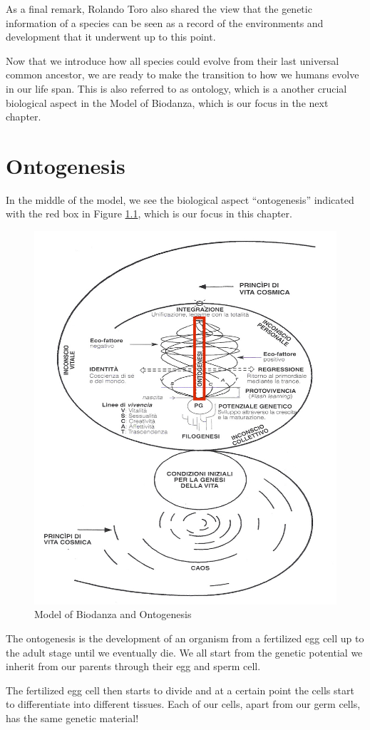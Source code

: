\documentclass[
  11pt,
]{book}
\begin{document}
As a final remark, Rolando Toro also shared the view that the genetic information of a species can be seen as a record of the environments and development that it underwent up to this point.

Now that we introduce how all species could evolve from their last universal common ancestor, we are ready to make the transition to how we humans evolve in our life span. This is also referred to as ontology, which is a another crucial biological aspect in the Model of Biodanza, which is our focus in the next chapter.

\hypertarget{ontogenesis}{%
\chapter{Ontogenesis}\label{ontogenesis}}

In the middle of the model, we see the biological aspect ``ontogenesis'' indicated with the red box in Figure \ref{fig:modelOnto}, which is our focus in this chapter.

\begin{figure}

{\centering \includegraphics[width=0.5\linewidth]{./figs/biologischeAspectenBiodanzaDeelIII} 

}

\caption{Model of Biodanza and Ontogenesis}\label{fig:modelOnto}
\end{figure}

The ontogenesis is the development of an organism from a fertilized egg cell up to the adult stage until we eventually die.
We all start from the genetic potential we inherit from our parents through their egg and sperm cell.

The fertilized egg cell then starts to divide and at a certain point the cells start to differentiate into different tissues.
Each of our cells, apart from our germ cells, has the same genetic material!
\end{document}
